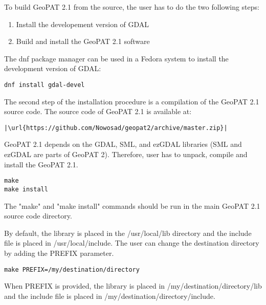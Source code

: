 To build GeoPAT 2.1 from the source, the user has to do the two following steps:

\begin{enumerate}
    \item{Install the developement version of GDAL}
    \item{Build and install the GeoPAT 2.1 software}
\end{enumerate}

The dnf package manager can be used in a Fedora system to install the development version of GDAL:

\begin{lstlisting}
dnf install gdal-devel
\end{lstlisting}

The second step of the installation procedure is a compilation of the GeoPAT 2.1 source code.
The source code of GeoPAT 2.1 is available at:
\begin{lstlisting}[escapechar=|]
|\url{https://github.com/Nowosad/geopat2/archive/master.zip}|
\end{lstlisting}
GeoPAT 2.1 depends on the GDAL, SML, and ezGDAL libraries (SML and ezGDAL are parts of GeoPAT 2).
Therefore, user has to unpack, compile and install the GeoPAT 2.1.
\begin{lstlisting}
make
make install
\end{lstlisting}
The "make" and "make install" commands should be run in the main GeoPAT 2.1 source code directory.

By default, the library is placed in the /usr/local/lib directory and the include file is placed in /usr/local/include.
The user can change the destination directory by adding the PREFIX parameter.
\begin{lstlisting}
make PREFIX=/my/destination/directory
\end{lstlisting}
When PREFIX is provided, the library is placed in /my/destination/directory/lib and the include file is placed in /my/destination/directory/include.
